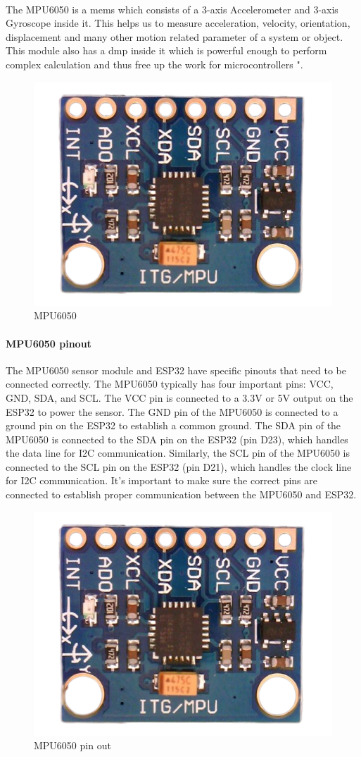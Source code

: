 \paragraph{}
The MPU6050 is a \ac{mems} which consists of a 3-axis Accelerometer and 3-axis Gyroscope inside it. This helps us to measure acceleration, velocity, orientation, displacement and many other motion related parameter of a system or object. This module also has a \ac{dmp} inside it which is powerful enough to perform complex calculation and thus free up the work for microcontrollers "\cite{mpu}.
\begin{figure}[h]
	\centering
	\includegraphics[width=0.5\linewidth]{images/mpu6050}
	\caption{MPU6050}
	\label{fig:mpu6050}
\end{figure}
\paragraph{MPU6050 pinout}
The MPU6050 sensor module and ESP32 have specific pinouts that need to be connected correctly. The MPU6050 typically has four important pins: VCC, GND, SDA, and SCL. The VCC pin is connected to a 3.3V or 5V output on the ESP32 to power the sensor. The GND pin of the MPU6050 is connected to a ground pin on the ESP32 to establish a common ground. The SDA pin of the MPU6050 is connected to the SDA pin on the ESP32 (pin D23), which handles the data line for I2C communication. Similarly, the SCL pin of the MPU6050 is connected to the SCL pin on the ESP32 (pin D21), which handles the clock line for I2C communication. It's important to make sure the correct pins are connected to establish proper communication between the MPU6050 and ESP32.
\begin{figure}[h]
	\centering
	\includegraphics[width=0.5\linewidth]{images/mpu6050}
	\caption{MPU6050 pin out}
	\label{fig:mpu6050-pinout}
\end{figure}